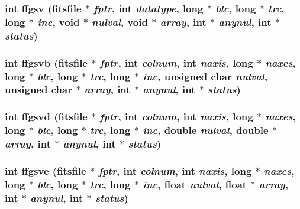 \subsubsection{\setlength{\rightskip}{0pt plus 5cm}int ffgsv (\bf{fitsfile} $\ast$ {\em fptr}, int {\em datatype}, long $\ast$ {\em blc}, long $\ast$ {\em trc}, long $\ast$ {\em inc}, void $\ast$ {\em nulval}, void $\ast$ {\em array}, int $\ast$ {\em anynul}, int $\ast$ {\em status})}\label{src_2fitsio_8h_caeaf7b359e9abbf70e7e912e14329fa}


\subsubsection{\setlength{\rightskip}{0pt plus 5cm}int ffgsvb (\bf{fitsfile} $\ast$ {\em fptr}, int {\em colnum}, int {\em naxis}, long $\ast$ {\em naxes}, long $\ast$ {\em blc}, long $\ast$ {\em trc}, long $\ast$ {\em inc}, unsigned char {\em nulval}, unsigned char $\ast$ {\em array}, int $\ast$ {\em anynul}, int $\ast$ {\em status})}\label{src_2fitsio_8h_83da0d68b492ed457e64f01e1dfad807}


\subsubsection{\setlength{\rightskip}{0pt plus 5cm}int ffgsvd (\bf{fitsfile} $\ast$ {\em fptr}, int {\em colnum}, int {\em naxis}, long $\ast$ {\em naxes}, long $\ast$ {\em blc}, long $\ast$ {\em trc}, long $\ast$ {\em inc}, double {\em nulval}, double $\ast$ {\em array}, int $\ast$ {\em anynul}, int $\ast$ {\em status})}\label{src_2fitsio_8h_d7a1005a5c7e8f1f436eac3d8e5d837d}


\subsubsection{\setlength{\rightskip}{0pt plus 5cm}int ffgsve (\bf{fitsfile} $\ast$ {\em fptr}, int {\em colnum}, int {\em naxis}, long $\ast$ {\em naxes}, long $\ast$ {\em blc}, long $\ast$ {\em trc}, long $\ast$ {\em inc}, float {\em nulval}, float $\ast$ {\em array}, int $\ast$ {\em anynul}, int $\ast$ {\em status})}\label{src_2fitsio_8h_caea21eb62f053c04e29d9fe6706e7ee}


